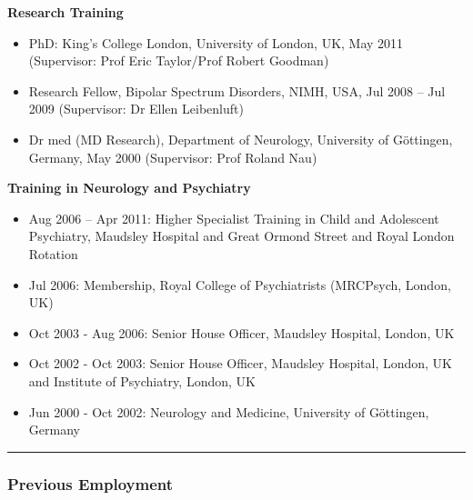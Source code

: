 \documentclass[
]{article}
\providecommand{\tightlist}{%
  \setlength{\itemsep}{0pt}\setlength{\parskip}{0pt}}
\begin{document}
\textbf{Research Training}

\begin{itemize}
\tightlist
\item
  PhD: King's College London, University of London, UK, May 2011
  (Supervisor: Prof Eric Taylor/Prof Robert Goodman)
\item
  Research Fellow, Bipolar Spectrum Disorders, NIMH, USA, Jul 2008 --
  Jul 2009 (Supervisor: Dr Ellen Leibenluft)
\item
  Dr med (MD Research), Department of Neurology, University of
  Göttingen, Germany, May 2000 (Supervisor: Prof Roland Nau)
\end{itemize}

\textbf{Training in Neurology and Psychiatry}

\begin{itemize}
\tightlist
\item
  Aug 2006 -- Apr 2011: Higher Specialist Training in Child and
  Adolescent Psychiatry, Maudsley Hospital and Great Ormond Street and
  Royal London Rotation
\item
  Jul 2006: Membership, Royal College of Psychiatrists (MRCPsych,
  London, UK)
\item
  Oct 2003 - Aug 2006: Senior House Officer, Maudsley Hospital, London,
  UK
\item
  Oct 2002 - Oct 2003: Senior House Officer, Maudsley Hospital, London,
  UK and Institute of Psychiatry, London, UK
\item
  Jun 2000 - Oct 2002: Neurology and Medicine, University of Göttingen,
  Germany
\end{itemize}

\begin{center}\rule{0.5\linewidth}{0.5pt}\end{center}

\hypertarget{previous-employment}{%
\subsubsection{Previous Employment}\label{previous-employment}}
\end{document}
